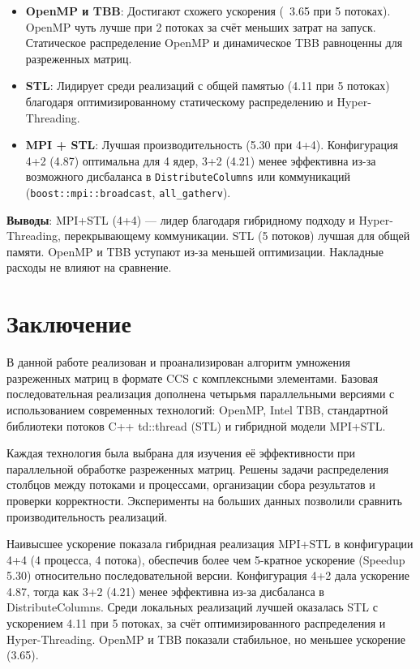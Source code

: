 \documentclass[12pt]{extarticle}
\begin{document}
\begin{itemize}
  \item \textbf{OpenMP и TBB}: Достигают схожего ускорения (~3.65 при 5 потоках). OpenMP чуть лучше при 2 потоках за счёт меньших затрат на запуск. Статическое распределение OpenMP и динамическое TBB равноценны для разреженных матриц.
  \item \textbf{STL}: Лидирует среди реализаций с общей памятью (4.11 при 5 потоках) благодаря оптимизированному статическому распределению и Hyper-Threading.
  \item \textbf{MPI + STL}: Лучшая производительность (5.30 при 4+4). Конфигурация 4+2 (4.87) оптимальна для 4 ядер, 3+2 (4.21) менее эффективна из-за возможного дисбаланса в \verb|DistributeColumns| или коммуникаций (\verb|boost::mpi::broadcast|, \verb|all_gatherv|).
\end{itemize}
 \hspace*{1.25em}\textbf{Выводы}: MPI+STL (4+4) — лидер благодаря гибридному подходу и Hyper-Threading, перекрывающему коммуникации. STL (5 потоков) лучшая для общей памяти. OpenMP и TBB уступают из-за меньшей оптимизации. Накладные расходы не влияют на сравнение.


\newpage
\section{Заключение}

\hspace*{1.25em}В данной работе реализован и проанализирован алгоритм умножения разреженных матриц в формате CCS с комплексными элементами. Базовая последовательная реализация дополнена четырьмя параллельными версиями с использованием современных технологий: OpenMP, Intel TBB, стандартной библиотеки потоков C++ td::thread (STL) и гибридной модели MPI+STL.

Каждая технология была выбрана для изучения её эффективности при параллельной обработке разреженных матриц. Решены задачи распределения столбцов между потоками и процессами, организации сбора результатов и проверки корректности. Эксперименты на больших данных позволили сравнить производительность реализаций.

Наивысшее ускорение показала гибридная реализация MPI+STL в конфигурации 4+4 (4 процесса, 4 потока), обеспечив более чем 5-кратное ускорение (Speedup 5.30) относительно последовательной версии. Конфигурация 4+2 дала ускорение 4.87, тогда как 3+2 (4.21) менее эффективна из-за дисбаланса в DistributeColumns. Среди локальных реализаций лучшей оказалась STL с ускорением 4.11 при 5 потоках, за счёт оптимизированного распределения и Hyper-Threading. OpenMP и TBB показали стабильное, но меньшее ускорение (3.65).
\end{document}
